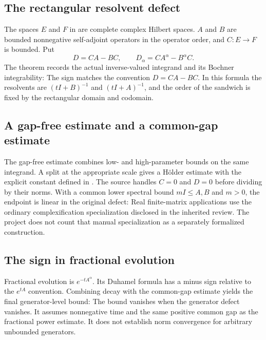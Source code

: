 \subsection{The rectangular resolvent defect}
The spaces $E$ and $F$ in  are complete complex Hilbert spaces. $A$ and $B$ are bounded nonnegative self-adjoint operators in the operator order, and $C:E\to F$ is bounded. Put
\[
D=CA-BC,\qquad D_\alpha=CA^\alpha-B^\alpha C.
\]
The theorem records the actual inverse-valued integrand and its Bochner integrability:
The sign matches the convention $D=CA-BC$. In this formula the resolvents are $(tI+B)^{-1}$ and $(tI+A)^{-1}$, and the order of the sandwich is fixed by the rectangular domain and codomain.

\subsection{A gap-free estimate and a common-gap estimate}
The gap-free estimate combines low- and high-parameter bounds on the same integrand. A split at the appropriate scale gives a H\"older estimate with the explicit constant defined in . The source handles $C=0$ and $D=0$ before dividing by their norms.
With a common lower spectral bound $mI\le A,B$ and $m>0$, the endpoint is linear in the original defect:
Real finite-matrix applications use the ordinary complexification specialization disclosed in the inherited review. The project does not count that manual specialization as a separately formalized construction.

\subsection{The sign in fractional evolution}
Fractional evolution is $e^{-tA^\alpha}$. Its Duhamel formula has a minus sign relative to the $e^{tA}$ convention. Combining decay with the common-gap estimate yields the final generator-level bound:
The bound vanishes when the generator defect vanishes. It assumes nonnegative time and the same positive common gap as the fractional power estimate. It does not establish norm convergence for arbitrary unbounded generators.

